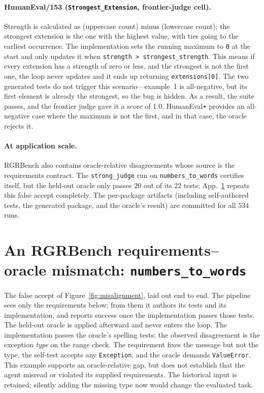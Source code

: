 \documentclass{article}
\begin{document}
\paragraph{HumanEval/153 (\texttt{Strongest\_Extension}, frontier-judge cell).} Strength is
calculated as (uppercase count) minus (lowercase count); the strongest extension is the one with
the highest value, with ties going to the earliest occurrence. The implementation sets the running
maximum to \texttt{0} at the start and only updates it when \texttt{strength > strongest\_strength}.
This means if every extension has a strength of zero or less, and the strongest is not the first
one, the loop never updates and it ends up returning \texttt{extensions[0]}. The two generated
tests do not trigger this scenario---example~1 is all-negative, but its first element is already
the strongest, so the bug is hidden. As a result, the suite passes, and the frontier judge gave it
a score of $1.0$. HumanEval\texttt{+} provides an all-negative case where the maximum is not the
first, and in that case, the oracle rejects it.

\paragraph{At application scale.} RGRBench also contains oracle-relative disagreements
whose source is the requirements contract. The
\texttt{strong\_judge} run on \texttt{numbers\_to\_words} certifies itself, but the held-out oracle
only passes $20$ out of its $22$ tests; App.~\ref{app:telephone} repeats this false accept
completely. The per-package artifacts (including self-authored tests, the generated package, and
the oracle's result) are committed for all $534$ runs.

\section{An RGRBench requirements--oracle mismatch: \texttt{numbers\_to\_words}}
\label{app:telephone}

The false accept of Figure~\ref{fig:misalignment}, laid out end to end. The pipeline sees only
the requirements below; from them it authors its tests and its implementation, and reports success
once the implementation passes those tests. The held-out oracle is applied afterward and never
enters the loop. The implementation passes the oracle's spelling tests; the observed disagreement is the
exception \emph{type} on the range check. The requirement fixes the message but not the
type, the self-test accepts any \texttt{Exception}, and the oracle demands
\texttt{ValueError}. This example supports an oracle-relative gap, but does not establish
that the agent misread or violated its supplied requirements. The historical input is
retained; silently adding the missing type now would change the evaluated task.
\end{document}
